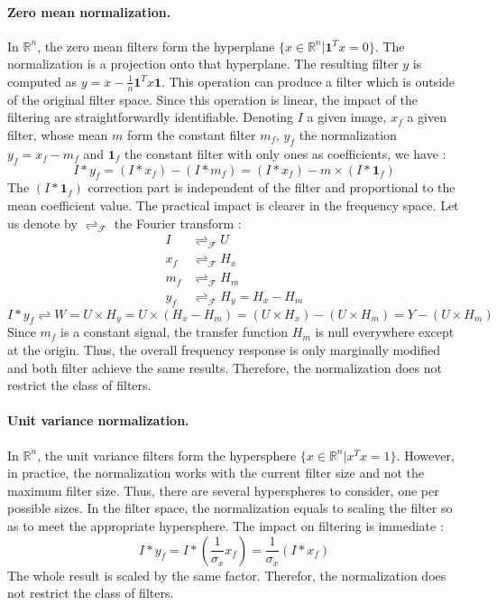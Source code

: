 \documentclass[a4paper]{report}
\begin{document}
			\paragraph{Zero mean normalization.}
			In $\mathbb{R}^n$, the zero mean filters form the hyperplane $\{x \in \mathbb{R}^n | \textbf{1}^{T}x = 0\}$. The normalization is a projection onto that hyperplane. The resulting filter $y$ is computed as $y = x - \frac{1}{n}\textbf{1}^{T}x\textbf{1}$. This operation can produce a filter which is outside of the original filter space.
			Since this operation is linear, the impact of the filtering are straightforwardly identifiable. Denoting $I$ a given image, $x_f$ a given filter, whose mean $m$ form the constant filter $m_f$, $y_f$ the normalization $ y_f = x_f - m_f$ and $\textbf{1}_f$ the constant filter with only ones as coefficients, we have : 
			\[
				I * y_f = (I * x_f) - (I * m_f) = (I * x_f) - m \times (I * \textbf{1}_f)
			\]
			The $(I * \textbf{1}_f)$ correction part is independent of the filter and proportional to the mean coefficient value. The practical impact is clearer in the frequency space. Let us denote by $\rightleftharpoons_\mathcal{F}$ the Fourier transform : 
			\begin{align*}
				I &\rightleftharpoons_\mathcal{F} U \\
				x_f &\rightleftharpoons_\mathcal{F} H_x \\
				m_f &\rightleftharpoons_\mathcal{F} H_m \\
				y_f &\rightleftharpoons_\mathcal{F} H_y = H_x - H_m
			\end{align*}
			\[
				I * y_f \rightleftharpoons W = U \times H_y = U \times (H_x - H_m) = (U \times H_x) - (U \times H_m) = Y - (U \times H_m)
			\]
			Since $m_f$ is a constant signal, the transfer function $H_m$ is null everywhere except at the origin. Thus, the overall frequency response is only marginally modified and both filter achieve the same results.
			Therefore, the normalization does not restrict the class of filters.
			
			\paragraph{Unit variance normalization.}
			In $\mathbb{R}^n$, the unit variance filters form the hypersphere $\{x \in \mathbb{R}^n | x^{T}x = 1\}$. However, in practice, the normalization works with the current filter size and not the maximum filter size. Thus, there are several hyperspheres to consider, one per possible sizes. 
			In the filter space, the normalization equals to scaling the filter so as to meet the appropriate hypersphere. The impact on filtering is immediate :
			\[
				I * y_f = I * (\frac{1}{\sigma_x} x_f) = \frac{1}{\sigma_x} (I * x_f)
			\]
			The whole result is scaled by the same factor. Therefor, the normalization does not restrict the class of filters.
			
\end{document}
